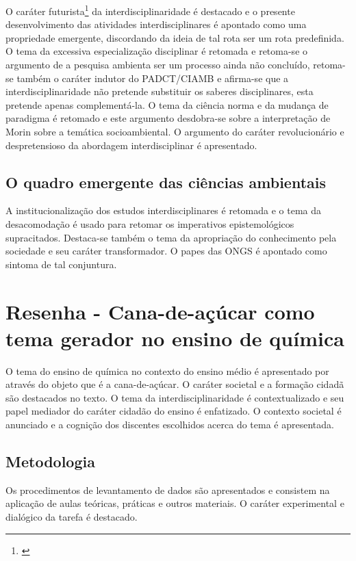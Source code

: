 \documentclass[
   article,       %
   12pt,          %
   oneside,       %
   a4paper,       %
   english,       %
   brazil,           %
   sumario=tradicional
   ]{abntex2}
\begin{document}
O caráter futurista\footnote{\cite[p.271]{Interdisciplinaridade_Futura}} da interdisciplinaridade é destacado e o presente desenvolvimento das atividades interdisciplinares é apontado como uma propriedade emergente, discordando da ideia de tal rota ser um rota predefinida. O tema da excessiva especialização disciplinar é retomada e retoma-se o argumento de a pesquisa ambienta ser um processo ainda não concluído, retoma-se também o caráter indutor do PADCT/CIAMB e afirma-se que a interdisciplinaridade não pretende substituir os saberes disciplinares, esta pretende apenas complementá-la. O tema da ciência norma e da mudança de paradigma é retomado e este argumento desdobra-se sobre a interpretação de Morin sobre a temática socioambiental. O argumento do caráter revolucionário e despretensioso da abordagem interdisciplinar é apresentado.


\subsection{O quadro emergente das ciências ambientais}

A institucionalização dos estudos interdisciplinares é retomada e o tema da desacomodação é usado para retomar os imperativos epistemológicos supracitados. Destaca-se também o tema da apropriação do conhecimento pela sociedade e seu caráter transformador. O papes das ONGS é apontado como sintoma de tal conjuntura.





\newpage

\section{Resenha - Cana-de-açúcar como tema gerador no ensino de química}

O tema do ensino de química no contexto do ensino médio é apresentado por \cite{Cana_quimica} através do objeto que é a cana-de-açúcar. O caráter societal e a formação cidadã são destacados no texto. O tema da interdisciplinaridade é contextualizado e seu papel mediador do caráter cidadão do ensino é enfatizado. O contexto societal é anunciado e a cognição dos discentes escolhidos acerca do tema é apresentada.

\subsection{Metodologia}


Os procedimentos de levantamento de dados são apresentados e consistem na aplicação de aulas teóricas, práticas e outros materiais. O caráter experimental e dialógico da tarefa é destacado.
\end{document}
